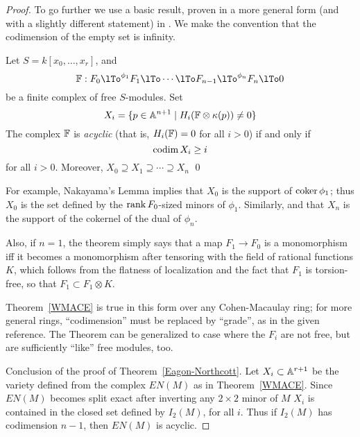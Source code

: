 \begin{proof}
To go further we use a basic result, proven in a more general form (and with a slightly different statement) in \cite[Theorem ***]{E}. We make the convention
that the codimension of the empty set is infinity.

\begin{theorem}\label{WMACE}
 Let $S = k[x_0,\dots, x_r]$, and
 $$ 
\FF:  F_0\lTo^{\phi_1}F_1 \lTo \cdots \lTo F_{n-1}\lTo^{\phi_n} F_n\lTo 0
 $$
be a finite complex of free $S$-modules. Set
$$
X_i = \{p\in \AA^{n+1} \mid  H_i(\FF \otimes \kappa(p)) \neq 0\}
$$
The complex $\FF$ is \emph{acyclic} (that is, $H_i(\FF) = 0$ for all $i>0$) if and only if
$$
\codim X_i \geq i
$$
for all $i>0$. Moreover, $X_{0}\supseteq X_{1}\supseteq \cdots \supseteq X_{n}$
\qed
\end{theorem}

For example, Nakayama's Lemma implies that $X_{0}$ is the support of $\coker \phi_{1}$; thus $X_{0}$ is the set defined by the $\rank F_{0}$-sized minors of $\phi_{1}$. Similarly, 
and that $X_{n}$ is the support of the cokernel of the dual of $\phi_{n}$. 

Also, if $n=1$, the theorem simply says that a map $F_1\to F_0$ is a monomorphism iff it becomes a monomorphism after tensoring with the field of rational functions $K$, which follows from the flatness of
localization and the fact that $F_1$ is torsion-free, so that
$F_1 \subset F_1 \otimes K$. 

\begin{fact}
Theorem~\ref{WMACE} is true in this form over any Cohen-Macaulay ring; for more general
rings, ``codimension'' must be replaced by ``grade'', as in the given reference.
The Theorem can be generalized
to case where the $F_i$ are not free, but are sufficiently ``like'' free modules, too.
\end{fact}

Conclusion of the proof of Theorem~\ref{Eagon-Northcott}.
Let $X_{i}\subset \AA^{r+1}$ be the variety defined from the complex $EN(M)$ as in 
Theorem~\ref{WMACE}. Since $EN(M)$ becomes split exact after inverting any $2\times 2$ minor of $M$
$X_{i}$ is
contained in the closed set defined by $I_{2}(M)$, for all $i$. Thus if $I_{2}(M)$ has codimension $n-1$,
then $EN(M)$ is acyclic. 
\end {proof}

